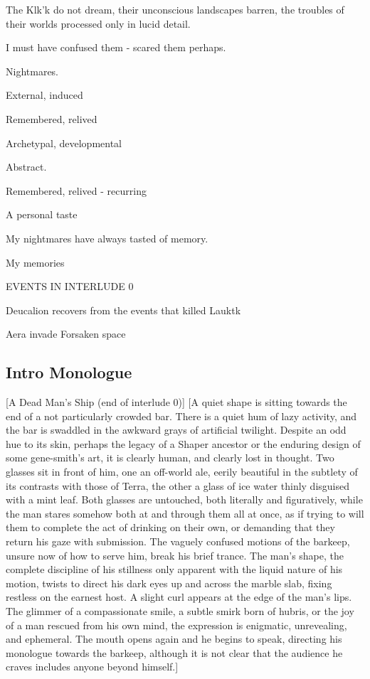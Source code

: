 \begin{itemize}
The Klk'k do not dream, their unconscious landscapes barren, the troubles of their worlds processed only in lucid detail.

I must have confused them - scared them perhaps.

Nightmares. 

External, induced

Remembered, relived

Archetypal, developmental

Abstract.

Remembered, relived - recurring

A personal taste

My nightmares have always tasted of memory.

My memories

EVENTS IN INTERLUDE 0

Deucalion recovers from the events that killed Lauktk

Aera invade Forsaken space
\end{itemize}
\subsection{Intro Monologue}

[A Dead Man's Ship (end of interlude 0)] [A quiet shape is sitting
towards the end of a not particularly crowded bar.  There is a quiet
hum of lazy activity, and the bar is swaddled in the awkward grays of
artificial twilight. Despite an odd hue to its skin, perhaps the
legacy of a Shaper ancestor or the enduring design of some
gene-smith's art, it is clearly human, and clearly lost in
thought. Two glasses sit in front of him, one an off-world ale, eerily
beautiful in the subtlety of its contrasts with those of Terra, the
other a glass of ice water thinly disguised with a mint leaf. Both
glasses are untouched, both literally and figuratively, while the man
stares somehow both at and through them all at once, as if trying to
will them to complete the act of drinking on their own, or demanding
that they return his gaze with submission. The vaguely confused
motions of the barkeep, unsure now of how to serve him, break his
brief trance. The man's shape, the complete discipline of his
stillness only apparent with the liquid nature of his motion, twists
to direct his dark eyes up and across the marble slab, fixing restless
on the earnest host. A slight curl appears at the edge of the man's
lips. The glimmer of a compassionate smile, a subtle smirk born of
hubris, or the joy of a man rescued from his own mind, the expression
is enigmatic, unrevealing, and ephemeral. The mouth opens again and he
begins to speak, directing his monologue towards the barkeep, although
it is not clear that the audience he craves includes anyone beyond
himself.]

